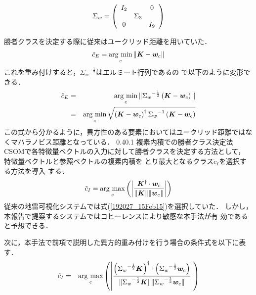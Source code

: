 ﻿\documentclass[a4j, 10pt]{jarticle}
\makeatletter
\newcommand{\argmax}{\mathop{\rm arg~max}\limits}
\newcommand{\argmin}{\mathop{\rm arg~min}\limits}
\renewcommand{\subsection}{%
\@startsection{subsection}{1}{\z@}%
{0.4\Cvs}{0.1\Cvs}%
{\bf\large}}
\makeatother
\begin{document}
\begin{equation}
\Sigma_w = \left(\begin{array}{ccc}
	   I_2& &\Large{0} \\
 &\Sigma_3& \\
\Large{0}& &I_9
		\end{array}
\right) 
\end{equation}

勝者クラスを決定する際に従来はユークリッド距離を用いていた．
\begin{equation}
\tilde{c}_E = \argmin_{c} \|{\bm K} - {\bm w_c} \|\label{192027_15Feb15}
\end{equation}
これを重み付けすると，${\Sigma_w}^{-\frac{1}{2}}$はエルミート行列であるの
で以下のように変形できる．
\begin{eqnarray}
\tilde{c}_E&=&\argmin_{c} \|{\Sigma_w}^{-\frac{1}{2}}\left({\bm K} -
						      {\bm w_c}\right)\|\\
 &=&\argmin_{c} \sqrt{\left({\bm K} - {\bm w_c}\right)^{\dagger}
    {\Sigma_w}^{-1}\left({\bm K} - {\bm w_c}\right)}
\end{eqnarray}
この式から分かるように，異方性のある要素においてはユークリッド距離ではな
くマハラノビス距離となっている．
\subsection{複素内積での勝者クラス決定法}
CSOMで各特徴量ベクトルの入力に対して勝者クラスを決定する方法として，
特徴量ベクトルと参照ベクトルの複素内積を
とり最大となるクラス$\tilde{c}_I$を選択する方法\cite{2010Yoshida}を導入
する．
\begin{eqnarray}
\tilde{c}_I = \argmax_{c} \left( \left|
 \frac{{\bm K}^{\dagger}\cdot{\bm w_c}}{ \|{\bm K}\| \| {\bm w_c} \| }
                                   \right| \right)
\end{eqnarray}
従来の地雷可視化システムでは式(\ref{192027_15Feb15})を選択していた．
しかし，本報告で提案するシステムではコヒーレンスにより敏感な本手法が有
効であると予想できる．

次に，本手法で前項で説明した異方的重み付けを行う場合の条件式を以下に表す．
\begin{eqnarray}
\tilde{c}_I &=& \argmax_{c} \left( \left|
\frac{\left({\Sigma_w}^{-\frac{1}{2}}{\bm K}\right)^{\dagger}\cdot
\left({\Sigma_w}^{-\frac{1}{2}}{\bm w_c}\right)
}{ \|{\Sigma_w}^{-\frac{1}{2}}{\bm K}\| \|{\Sigma_w}^{-\frac{1}{2}}{\bm w_c} \| }
                                   \right| \right)
\end{eqnarray}
\end{document}
